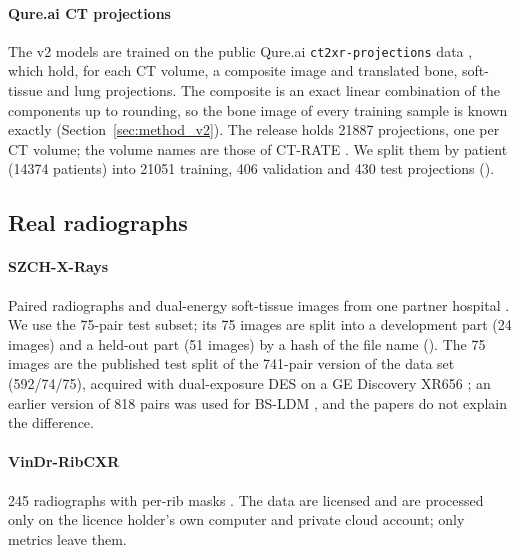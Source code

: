\paragraph{Qure.ai CT projections} The v2 models are trained on the public Qure.ai \texttt{ct2xr-projections} data \citep{angaitkar2026anatomy}, which
hold, for each CT volume, a composite image and translated bone, soft-tissue and lung projections. The composite is an exact linear combination of
the components up to rounding, so the bone image of every training sample is known exactly (Section~\ref{sec:method_v2}).
The release holds \num{21887} projections, one per CT volume; the volume names are those of CT-RATE \citep{hamamci2026ctrate}. We split them by
patient (\num{14374} patients) into \num{21051} training, 406 validation and 430 test projections ().

\subsection{Real radiographs}
\paragraph{SZCH-X-Rays} Paired radiographs and dual-energy soft-tissue images from one partner hospital \citep{sun2026bsldm,sun2026debonedit}. We use the
75-pair test subset; its 75 images are split into a development part (24 images) and a held-out part (51 images) by a hash of the file name
(). The 75 images are the published test split of the 741-pair version of the data set (592/74/75), acquired with dual-exposure DES on a GE
Discovery XR656 \citep{sun2026debonedit}; an earlier version of 818 pairs was used for BS-LDM \citep{sun2026bsldm}, and the papers do not
explain the difference.

\paragraph{VinDr-RibCXR} 245 radiographs with per-rib masks \citep{nguyen2021ribcxr}. The data are licensed and are processed only on the licence
holder's own computer and private cloud account; only metrics leave them.

